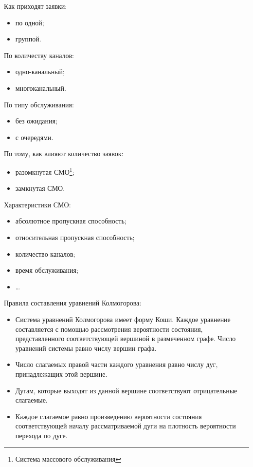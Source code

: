 \documentclass[a4paper,10pt,notitlepage,pdftex,headsepline]{scrartcl}
\begin{document}
  Как приходят заявки:
  \begin{itemize}
    \item по одной;
    \item группой.
  \end{itemize}

  По количеству каналов:
  \begin{itemize}
    \item одно-канальный;
    \item многоканальный.
  \end{itemize}

  По типу обслуживания:
  \begin{itemize}
    \item без ожидания;
    \item с очередями.
  \end{itemize}

  По тому, как влияют количество заявок:
  \begin{itemize}
    \item разомкнутая СМО\footnote{Система массового обслуживания};
    \item замкнутая СМО.
  \end{itemize}

  Характеристики СМО:
  \begin{itemize}
    \item абсолютное пропускная способность;
    \item относительная пропускная способность;
    \item количество каналов;
    \item время обслуживания;
    \item \ldots
  \end{itemize}

  Правила составления уравнений Колмогорова:
  \begin{itemize}
    \item Система уравнений Колмогорова имеет форму Коши. Каждое уравнение
      составляется с помощью рассмотрения вероятности состояния, представленного
      соответствующей вершиной в размеченном графе. Число уравнений системы равно
      числу вершин графа.
    \item Число слагаемых правой части каждого уравнения равно числу дуг,
      принадлежащих этой вершине.
    \item Дугам, которые выходят из данной вершине соответствуют отрицательные
      слагаемые.
    \item Каждое слагаемое равно произведению вероятности состояния
      соответствующей началу рассматриваемой дуги на плотность вероятности
      перехода по дуге.
  \end{itemize}
\end{document}
